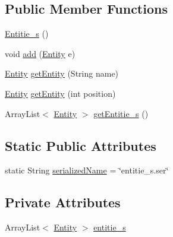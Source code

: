 \subsection*{Public Member Functions}
\begin{DoxyCompactItemize}
\item 
\hyperlink{classit_1_1isislab_1_1masonhelperdocumentation_1_1_o_d_d_1_1_entitie__s_a50564b24a82025ca4406b0cc7cd892e2}{Entitie\-\_\-s} ()
\item 
void \hyperlink{classit_1_1isislab_1_1masonhelperdocumentation_1_1_o_d_d_1_1_entitie__s_a0ba0b9a58c1ab1e1039547669e2e7306}{add} (\hyperlink{classit_1_1isislab_1_1masonhelperdocumentation_1_1_o_d_d_1_1_entity}{Entity} e)
\item 
\hyperlink{classit_1_1isislab_1_1masonhelperdocumentation_1_1_o_d_d_1_1_entity}{Entity} \hyperlink{classit_1_1isislab_1_1masonhelperdocumentation_1_1_o_d_d_1_1_entitie__s_ad931ea383d1498d36bfd01085581ebeb}{get\-Entity} (String name)
\item 
\hyperlink{classit_1_1isislab_1_1masonhelperdocumentation_1_1_o_d_d_1_1_entity}{Entity} \hyperlink{classit_1_1isislab_1_1masonhelperdocumentation_1_1_o_d_d_1_1_entitie__s_a6253550cf2bd7a8afe508bc2a5e3a2c0}{get\-Entity} (int position)
\item 
Array\-List$<$ \hyperlink{classit_1_1isislab_1_1masonhelperdocumentation_1_1_o_d_d_1_1_entity}{Entity} $>$ \hyperlink{classit_1_1isislab_1_1masonhelperdocumentation_1_1_o_d_d_1_1_entitie__s_aaf802a7d616715069086b1b4040fe460}{get\-Entitie\-\_\-s} ()
\end{DoxyCompactItemize}
\subsection*{Static Public Attributes}
\begin{DoxyCompactItemize}
\item 
static String \hyperlink{classit_1_1isislab_1_1masonhelperdocumentation_1_1_o_d_d_1_1_entitie__s_a104c4d736157bbfe3f25c1563ab8cec8}{serialized\-Name} = \char`\"{}entitie\-\_\-s.\-ser\char`\"{}
\end{DoxyCompactItemize}
\subsection*{Private Attributes}
\begin{DoxyCompactItemize}
\item 
Array\-List$<$ \hyperlink{classit_1_1isislab_1_1masonhelperdocumentation_1_1_o_d_d_1_1_entity}{Entity} $>$ \hyperlink{classit_1_1isislab_1_1masonhelperdocumentation_1_1_o_d_d_1_1_entitie__s_a9baee9211ad510a6eda7db37a7978b01}{entitie\-\_\-s}
\end{DoxyCompactItemize}
